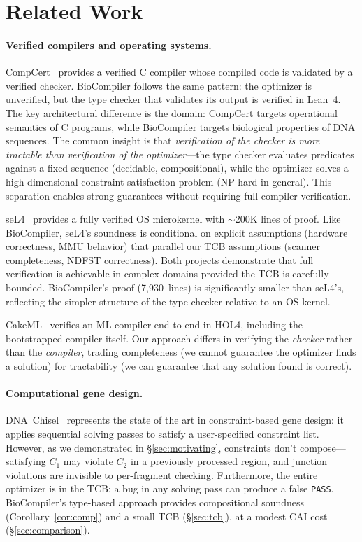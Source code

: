 \section{Related Work}\label{sec:related}

\paragraph{Verified compilers and operating systems.}
CompCert~\cite{leroy2009compcert} provides a verified C compiler whose
compiled code is validated by a verified checker.  BioCompiler follows
the same pattern: the optimizer is unverified, but the type checker that
validates its output is verified in Lean~4.  The key architectural
difference is the domain: CompCert targets operational semantics of C
programs, while BioCompiler targets biological properties of DNA
sequences.  The common insight is that \emph{verification of the checker
is more tractable than verification of the optimizer}---the type checker
evaluates predicates against a fixed sequence (decidable, compositional),
while the optimizer solves a high-dimensional constraint satisfaction
problem (NP-hard in general).  This separation enables strong guarantees
without requiring full compiler verification.

seL4~\cite{klein2014sel4} provides a fully verified OS microkernel with
$\sim$200K lines of proof.  Like BioCompiler, seL4's soundness is
conditional on explicit assumptions (hardware correctness, MMU behavior)
that parallel our TCB assumptions (scanner completeness, NDFST
correctness).  Both projects demonstrate that full verification is
achievable in complex domains provided the TCB is carefully bounded.
BioCompiler's proof (7,930~lines) is significantly smaller than seL4's,
reflecting the simpler structure of the type checker relative to an OS
kernel.

CakeML~\cite{kumar2014cakeml} verifies an ML compiler end-to-end in
HOL4, including the bootstrapped compiler itself.  Our approach differs
in verifying the \emph{checker} rather than the \emph{compiler}, trading
completeness (we cannot guarantee the optimizer finds a solution) for
tractability (we can guarantee that any solution found is correct).

\paragraph{Computational gene design.}
DNA~Chisel~\cite{piret2020dnachisel} represents the state of the art in
constraint-based gene design: it applies sequential solving passes to
satisfy a user-specified constraint list.  However, as we demonstrated
in \S\ref{sec:motivating}, constraints don't compose---satisfying $C_1$
may violate $C_2$ in a previously processed region, and junction
violations are invisible to per-fragment checking.  Furthermore, the
entire optimizer is in the TCB: a bug in any solving pass can produce a
false \texttt{PASS}.  BioCompiler's type-based approach provides
compositional soundness (Corollary~\ref{cor:comp}) and a small TCB
(\S\ref{sec:tcb}), at a modest CAI cost (\S\ref{sec:comparison}).

